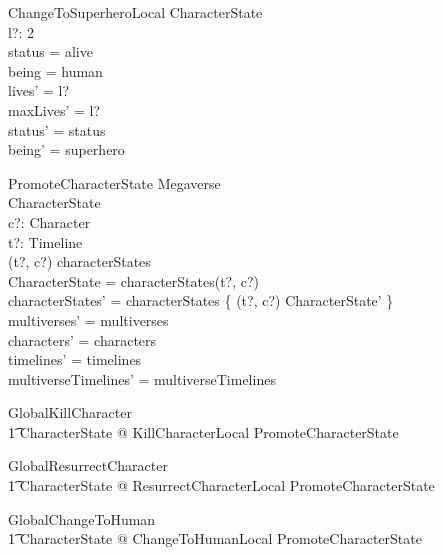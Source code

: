 \documentclass{article}
\begin{document}
\begin{schema}{ChangeToSuperheroLocal}
\Delta CharacterState \\
l?: 2  \\
\where
status = alive \\
being = human \\
lives' = l? \\
maxLives' = l? \\
status' = status \\
being' = superhero \\
\end{schema}

\begin{schema}{PromoteCharacterState}
\Delta Megaverse \\
\Delta CharacterState \\
c?: Character \\
t?: Timeline \\ 
\where 
(t?, c?) \in \dom characterStates \\ 
\theta CharacterState = characterStates(t?, c?) \\
characterStates' = characterStates \oplus \{ (t?, c?) \mapsto \theta CharacterState' \}   \\
multiverses' = multiverses \\
characters' = characters \\
timelines' = timelines \\
multiverseTimelines' = multiverseTimelines \\
\end{schema}

\begin{zed}
GlobalKillCharacter  \\
\t1 \exists \Delta CharacterState @ KillCharacterLocal \land PromoteCharacterState \\ 
\end{zed}

\begin{zed}
GlobalResurrectCharacter  \\
\t1 \exists \Delta CharacterState @ ResurrectCharacterLocal \land PromoteCharacterState \\
\end{zed}

\begin{zed}
GlobalChangeToHuman  \\ 
\t1 \exists \Delta CharacterState @ ChangeToHumanLocal \land PromoteCharacterState \\
\end{zed}
\end{document}
